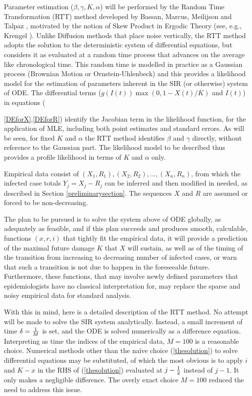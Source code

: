 \documentclass{article}
\begin{document}
Parameter estimation ($\beta, \gamma, K, \alpha$) will be performed by the Random Time Transformation (RTT) method developed by Bassan, Marcus, Meilijson and Talpaz \cite{Bassanetal}, motivated by the notion of Skew Product in Ergodic Theory (see, e.g., Krengel \cite{Krengel}). Unlike Diffusion methods that place noise vertically, the RTT method adopts the solution to the deterministic system of differential equations, but considers it as evaluated at a random time process that advances on the average like chronological time. This random time is modelled in practice as a Gaussian process (Brownian Motion or Ornstein-Uhlenbeck) and this provides a likelihood model for the estimation of parameters inherent in the SIR (or otherwise) system of ODE. The differential terms ($g(I(t)) \max(0,1 - X(t)/K)$ and $I(t)$) in equations ({\ref{DEforX},\ref{DEforR}) identify the Jacobian term in the likelihood function, for the application of MLE, including both point estimates and standard errors. As will be seen, for fixed $K$ and $\alpha$ the RTT method identifies $\beta$ and $\gamma$ directly, without reference to the Gaussian part. The likelihood model to be described thus provides a profile likelihood in terms of $K$ and $\alpha$ only.

\bigskip

Empirical data consist of $(X_1,R_1), (X_2,R_2), \dots, (X_n, R_n)$, from which the infected case totals $Y_j=X_j-R_j$ can be inferred and then modified in needed, as described in Section \ref{preliminarysection}. The sequences $X$ and $R$ are assumed or forced to be non-decreasing.

The plan to be pursued is to solve the system above of ODE globally, as adequately as feasible, and if this plan succeeds and produces smooth, calculable, functions $(x,r,i)$ that tightly fit the empirical data, it will provide a prediction of the maximal future damage $K$ that $X$ will sustain, as well as of the timing of the transition from increasing to decreasing number of infected cases, or warn that such a transition is not due to happen in the foreseeable future. Furthermore, these functions, that may involve newly defined parameters that epidemiologists have no classical interpretation for, may replace the sparse and noisy empirical data for standard analysis.

With this in mind, here is a detailed description of the RTT method. No attempt will be made to solve the SIR system analytically. Instead, a small increment of time $\delta={1 \over M}$ is set, and the ODE is solved numerically as a difference equation. Interpreting as time the indices of the empirical data, $M=100$ is a reasonable choice. Numerical methods other than the na\"{i}ve choice (\ref{thesolution}) to solve differential equations may be substituted, of which the most obvious is to apply $i$ and $K-x$ in the RHS of (\ref{thesolution}) evaluated at $j-{1 \over 2}$ instead of $j-1$. It only makes a negligible difference. The overly exact choice $M=100$ reduced the need to address this issue.

}
\end{document}
